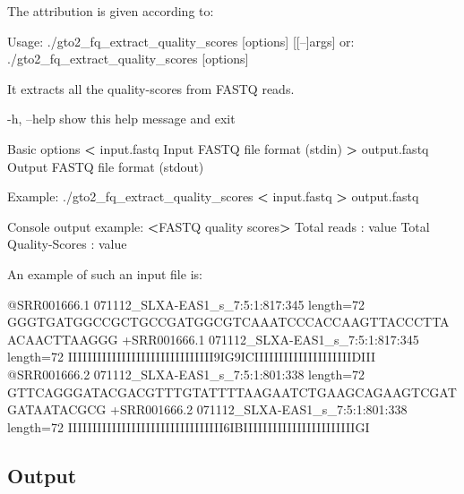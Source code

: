 \documentclass[11pt,]{krantz}
\newenvironment{Shaded}{\begin{snugshade}}{\end{snugshade}}
\newcommand{\OperatorTok}[1]{\textcolor[rgb]{0.43,0.43,0.43}{\textbf{#1}}}
\newcommand{\ExtensionTok}[1]{#1}
\newcommand{\NormalTok}[1]{#1}
\begin{document}
The attribution is given according to:

\begin{Shaded}
\begin{Highlighting}[]
\ExtensionTok{Usage}\NormalTok{: ./gto2_fq_extract_quality_scores [options] [[--]args]}
   \ExtensionTok{or}\NormalTok{: ./gto2_fq_extract_quality_scores [options]}

\ExtensionTok{It}\NormalTok{ extracts all the quality-scores from FASTQ reads.}

    \ExtensionTok{-h}\NormalTok{, --help            show this help message and exit}

\ExtensionTok{Basic}\NormalTok{ options}
    \OperatorTok{<} \ExtensionTok{input.fastq}\NormalTok{         Input FASTQ file format (stdin)}
    \OperatorTok{>} \ExtensionTok{output.fastq}\NormalTok{        Output FASTQ file format (stdout)}

\ExtensionTok{Example}\NormalTok{: ./gto2_fq_extract_quality_scores }\OperatorTok{<}\NormalTok{ input.fastq }\OperatorTok{>}
\ExtensionTok{output.fastq}

\ExtensionTok{Console}\NormalTok{ output example:}
\OperatorTok{<}\ExtensionTok{FASTQ}\NormalTok{ quality scores}\OperatorTok{>}
\ExtensionTok{Total}\NormalTok{ reads          : value}
\ExtensionTok{Total}\NormalTok{ Quality-Scores : value}
\end{Highlighting}
\end{Shaded}

An example of such an input file is:

\begin{Shaded}
\begin{Highlighting}[]
\ExtensionTok{@SRR001666.1}\NormalTok{ 071112_SLXA-EAS1_s_7:5:1:817:345 length=72}
\ExtensionTok{GGGTGATGGCCGCTGCCGATGGCGTCAAATCCCACCAAGTTACCCTTAACAACTTAAGGG}
\ExtensionTok{+SRR001666.1}\NormalTok{ 071112_SLXA-EAS1_s_7:5:1:817:345 length=72}
\ExtensionTok{IIIIIIIIIIIIIIIIIIIIIIIIIIIIII9IG9ICIIIIIIIIIIIIIIIIIIIIDIII}
\ExtensionTok{@SRR001666.2}\NormalTok{ 071112_SLXA-EAS1_s_7:5:1:801:338 length=72}
\ExtensionTok{GTTCAGGGATACGACGTTTGTATTTTAAGAATCTGAAGCAGAAGTCGATGATAATACGCG}
\ExtensionTok{+SRR001666.2}\NormalTok{ 071112_SLXA-EAS1_s_7:5:1:801:338 length=72}
\ExtensionTok{IIIIIIIIIIIIIIIIIIIIIIIIIIIIIIII6IBIIIIIIIIIIIIIIIIIIIIIIIGI}
\end{Highlighting}
\end{Shaded}

\subsection*{Output}\label{output-3}
\end{document}
